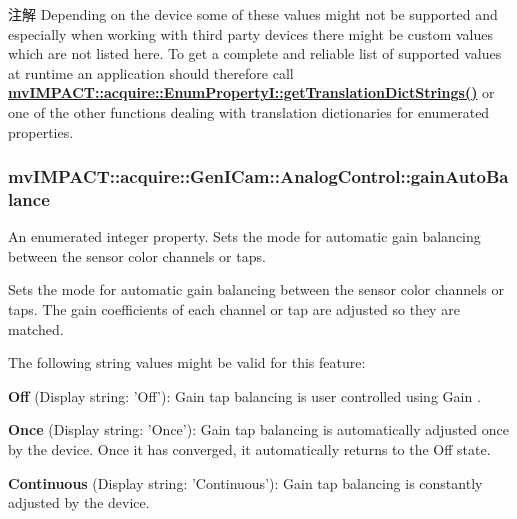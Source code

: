\begin{DoxyNote}{注解}
Depending on the device some of these values might not be supported and especially when working with third party devices there might be custom values which are not listed here. To get a complete and reliable list of supported values at runtime an application should therefore call {\bfseries \hyperlink{classmv_i_m_p_a_c_t_1_1acquire_1_1_enum_property_i_a0ba6ccbf5ee69784d5d0b537924d26b6}{mv\+I\+M\+P\+A\+C\+T\+::acquire\+::\+Enum\+Property\+I\+::get\+Translation\+Dict\+Strings()}} or one of the other functions dealing with translation dictionaries for enumerated properties. 
\end{DoxyNote}
\hypertarget{classmv_i_m_p_a_c_t_1_1acquire_1_1_gen_i_cam_1_1_analog_control_a6b94af874a57212af1c8fdc1751c2a28}{
\subsubsection[{gain\+Auto\+Balance}]{ mv\+I\+M\+P\+A\+C\+T\+::acquire\+::\+Gen\+I\+Cam\+::\+Analog\+Control\+::gain\+Auto\+Balance}}\label{classmv_i_m_p_a_c_t_1_1acquire_1_1_gen_i_cam_1_1_analog_control_a6b94af874a57212af1c8fdc1751c2a28}


An enumerated integer property. Sets the mode for automatic gain balancing between the sensor color channels or taps. 

Sets the mode for automatic gain balancing between the sensor color channels or taps. The gain coefficients of each channel or tap are adjusted so they are matched.

The following string values might be valid for this feature\+:
\begin{DoxyItemize}
\item {\bfseries Off} (Display string\+: 'Off')\+: Gain tap balancing is user controlled using Gain .
\item {\bfseries Once} (Display string\+: 'Once')\+: Gain tap balancing is automatically adjusted once by the device. Once it has converged, it automatically returns to the Off state.
\item {\bfseries Continuous} (Display string\+: 'Continuous')\+: Gain tap balancing is constantly adjusted by the device.
\end{DoxyItemize}

